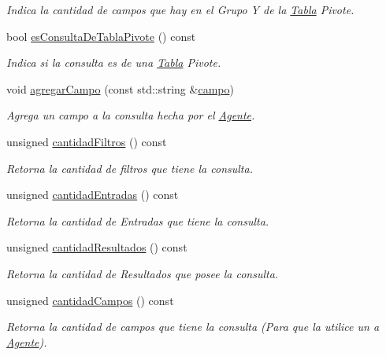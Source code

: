 \begin{DoxyCompactItemize}
\begin{DoxyCompactList}\small\item\em \-Indica la cantidad de campos que hay en el \-Grupo \-Y de la \hyperlink{classTabla}{\-Tabla} \-Pivote. \end{DoxyCompactList}\item 
bool \hyperlink{classConsulta_abea0b8acdf1d6dc9dc55998c5a13d022}{es\-Consulta\-De\-Tabla\-Pivote} () const 
\begin{DoxyCompactList}\small\item\em \-Indica si la consulta es de una \hyperlink{classTabla}{\-Tabla} \-Pivote. \end{DoxyCompactList}\item 
void \hyperlink{classConsulta_a353df10eb0afdf7135ffec3ee95d3980}{agregar\-Campo} (const std\-::string \&\hyperlink{classConsulta_a2002e971cfc49f7fdec5f7a9d1de3bf8}{campo})
\begin{DoxyCompactList}\small\item\em \-Agrega un campo a la consulta hecha por el \hyperlink{classAgente}{\-Agente}. \end{DoxyCompactList}\item 
unsigned \hyperlink{classConsulta_a1ebfc9dd876b84c9d97ecf7d60d20aa8}{cantidad\-Filtros} () const 
\begin{DoxyCompactList}\small\item\em \-Retorna la cantidad de filtros que tiene la consulta. \end{DoxyCompactList}\item 
unsigned \hyperlink{classConsulta_a1c1cf418be7d6d4932f5ed4b94900eb8}{cantidad\-Entradas} () const 
\begin{DoxyCompactList}\small\item\em \-Retorna la cantidad de \-Entradas que tiene la consulta. \end{DoxyCompactList}\item 
unsigned \hyperlink{classConsulta_a0b7a5033d52038604faa3c60e1563b6e}{cantidad\-Resultados} () const 
\begin{DoxyCompactList}\small\item\em \-Retorna la cantidad de \-Resultados que posee la consulta. \end{DoxyCompactList}\item 
unsigned \hyperlink{classConsulta_a4bc49d0bdbd55835f463d6d89dee81b6}{cantidad\-Campos} () const 
\begin{DoxyCompactList}\small\item\em \-Retorna la cantidad de campos que tiene la consulta (\-Para que la utilice un a \hyperlink{classAgente}{\-Agente}). \end{DoxyCompactList}\item 

\end{DoxyCompactItemize}
